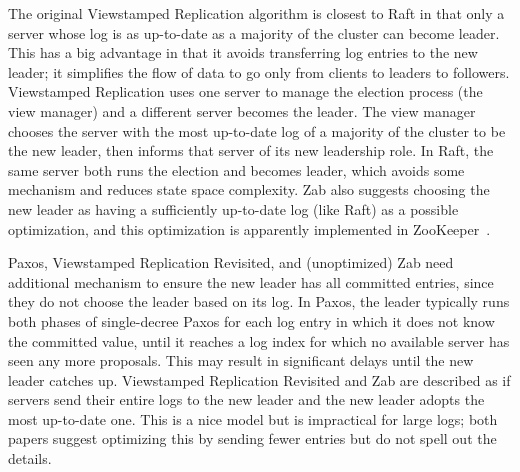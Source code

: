 The original Viewstamped Replication algorithm is closest to Raft in
that only a server whose log is as up-to-date as a majority of the
cluster can become leader. This has a big advantage in that it avoids
transferring log entries to the new leader; it simplifies the flow of
data to go only from clients to leaders to followers. Viewstamped
Replication uses one server to manage the election process (the view
manager) and a different server becomes the leader. The view manager
chooses the server with the most up-to-date log of a majority of the
cluster to be the new leader, then informs that server of its new
leadership role. In Raft, the same server both runs the election and
becomes leader, which avoids some mechanism and reduces state space
complexity. Zab also suggests choosing the new leader as having a
sufficiently up-to-date log (like Raft) as a possible optimization, and
this optimization is apparently implemented in
ZooKeeper~\cite{ZooKeeperPersonalCommunication}.

Paxos, Viewstamped Replication Revisited, and (unoptimized) Zab need
additional mechanism to ensure the new leader has all committed entries,
since they do not choose the leader based on its log. In Paxos, the
leader typically runs both phases of single-decree Paxos for each log
entry in which it does not know the committed value, until it reaches a
log index for which no available server has seen any more proposals.
This may result in significant delays until the new leader catches up.
Viewstamped Replication Revisited and Zab are described as if servers
send their entire logs to the new leader and the new leader adopts the
most up-to-date one. This is a nice model but is impractical for large
logs; both papers suggest optimizing this by sending fewer entries but
do not spell out the details.
